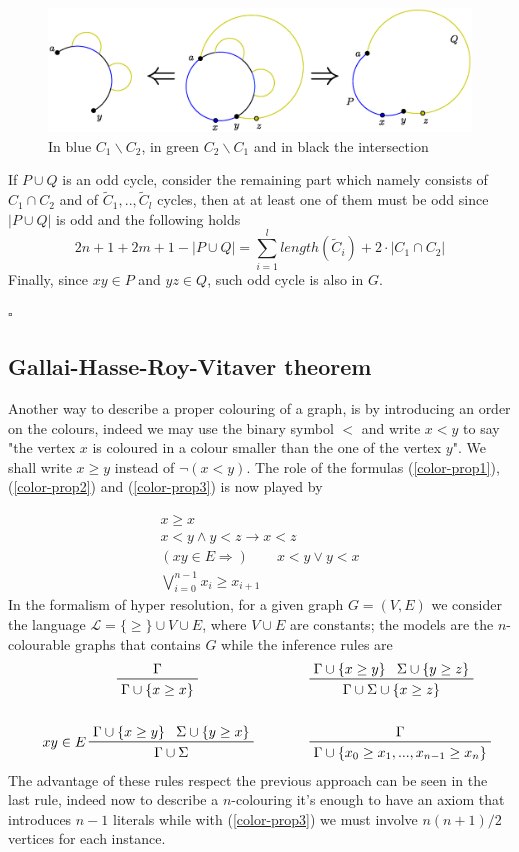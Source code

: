 \documentclass[a4paper,12pt,twoside]{book}
\newcommand*{\QED}{\hfill\ensuremath{\square}}
\let\o\vee
\let\e\wedge
\begin{document}
\begin{figure}[h]
\centering
\includegraphics[scale=0.5]{oddcycles-interceptions.eps}
\caption{In blue $C_1 \backslash C_2 $, in green $C_2\backslash C_1 $ and in black the intersection }
\end{figure}
If $P\cup Q$ is an odd cycle, consider the remaining part which namely consists of $C_1\cap C_2$ and of $\tilde{C}_1,..,\tilde{C}_l$ cycles, then at at least one of them must be odd since $|P\cup Q|$ is odd and the following holds $$2n+1+2m+1-|P\cup Q| = \sum^l_{i=1} length(\tilde{C}_i) + 2\cdot |C_1\cap C_2|   $$
Finally, since $xy\in P$ and $yz\in Q$, such odd cycle is also in $G$. 

\QED

\newpage
\subsection*{Gallai-Hasse-Roy-Vitaver theorem}

Another way to describe a proper colouring of a graph, is by introducing an order on the colours, indeed we may use the binary symbol $<$ and write $x<y$ to say "the vertex $x$ is coloured in a colour smaller than the one of the vertex $y$". We shall write $x\geq y $ instead of $\neg (x<y)$. The role of the formulas (\ref{color-prop1}), (\ref{color-prop2}) and (\ref{color-prop3}) is now played by 

\begin{gather}
x\geq x\\
x<y \e y<z \rightarrow x<z \\
( xy \in E \Rightarrow ) \qquad  x<y \o y<x\\
\bigvee_{i=0}^{n-1} x_i\geq x_{i+1}
\end{gather}
In the formalism of hyper resolution, for a given graph $G=(V,E)$ we consider the language $\mathscr{L}=\{\geq\}\cup V\cup E$, where $V\cup E$ are constants; the models are the $n$-colourable graphs that contains $G$ while the inference rules are
\begin{align*}
\prftree{\Gamma}{\Gamma \cup \{x\geq x\}}\qquad \qquad\qquad
& \qquad\prftree{\Gamma\cup\{x\geq y\}}{ \Sigma\cup\{y\geq z\} }{\Gamma\cup\Sigma\cup\{x\geq z\}} \\
\,&\,\\
\prftree[l]{$\quad xy \in E $}{\Gamma \cup \{ x\geq y \}}{\Sigma \cup \{ y\geq x \}}
{ \Gamma\cup\Sigma} \qquad &\qquad \prftree{\Gamma}
{\Gamma\cup\{x_0\geq x_1 ,..., x_{n-1}\geq x_n \}}
\end{align*}
The advantage of these rules respect the previous approach can be seen in the last rule, indeed now to describe a $n$-colouring it's enough to have an axiom that introduces $n-1$ literals while with (\ref{color-prop3}) we must involve $n(n+1)/2$ vertices for each instance.
\end{document}
